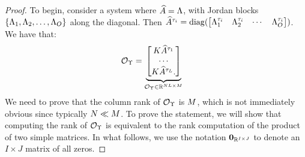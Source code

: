 \begin{proof}
	To begin, consider a system where $\widehat{A} = \Lambda$, with Jordan blocks $\{\Lambda_1, \Lambda_2, \dots, \Lambda_{O}\}$ along the 
	diagonal. Then $\widehat{A}^{\tau_i} = \operatorname{diag}(\begin{bmatrix}\Lambda_1^{\tau_i} & \Lambda_2^{\tau_i} & \cdots & \Lambda_{O}^{\tau_i}\end{bmatrix})$. 
	We have that:
	\begin{align*}
	\mathcal{O}_{\Upsilon} &=
	\underbrace{
		\begin{bmatrix} 
		K \widehat{A}^{\tau_1}\\
		\cdots\\
		K \widehat{A}^{\tau_L}.
		\end{bmatrix}}_{\mathcal{O}_{\Upsilon}\in\mathbb{R}^{NL\times M}}
	\end{align*}
	We need to prove that the column rank of $\mathcal{O}_{\Upsilon}$ is $M$, which is not immediately
	obvious since typically $N \ll M$. To prove the statement, we will show that 
	computing the rank of $\mathcal{O}_{\Upsilon}$ is equivalent to the rank computation of the product of 
	two simple matrices. In what follows,
	we use the notation $\mathbf{0}_{\mathbb{R}^{I\times J}}$ to denote an $I\times J$ matrix of all zeros. 
	

\end{proof}
